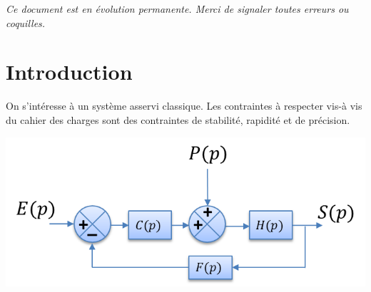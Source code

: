 \documentclass[10pt,oneside]{article}
\begin{document}

\setlength{\parskip}{0ex plus 0.2ex minus 0ex}
 \renewcommand{\contentsname}{}
 \renewcommand{\baselinestretch}{1}

\textit{Ce document est en évolution permanente. Merci de signaler toutes
erreurs ou coquilles.}

\tableofcontents

 \renewcommand{\baselinestretch}{1.2}
\setlength{\parskip}{2ex plus 0.5ex minus 0.2ex}

\section{Introduction}


On s'intéresse à un système asservi classique. Les contraintes à respecter vis-à vis du cahier des charges sont des contraintes de stabilité, rapidité et de précision.

\begin{center}
\includegraphics[width=.55\textwidth]{png/bloc1}
\end{center}
\end{document}
